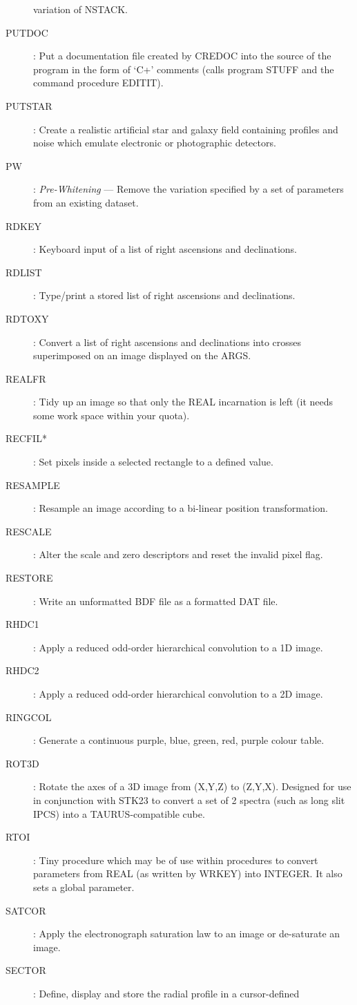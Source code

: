 \begin{description}
variation of NSTACK.
\item [PUTDOC]: Put a documentation file created by CREDOC into the source of
the program in the form of `C+' comments (calls program STUFF and the command
procedure EDITIT).
\item [PUTSTAR]: Create a realistic artificial star and galaxy field containing
profiles and noise which emulate electronic or photographic detectors.
\item [PW]: {\em Pre-Whitening} --- Remove the variation specified by a set of
parameters from an existing dataset.
\item [RDKEY]: Keyboard input of a list of right ascensions and declinations.
\item [RDLIST]: Type/print a stored list of right ascensions and declinations.
\item [RDTOXY]: Convert a list of right ascensions and declinations into crosses
superimposed on an image displayed on the ARGS.
\item [REALFR]: Tidy up an image so that only the REAL incarnation is left (it
needs some work space within your quota).
\item [RECFIL*]: Set pixels inside a selected rectangle to a defined value.
\item [RESAMPLE]: Resample an image according to a bi-linear position
transformation.
\item [RESCALE]: Alter the scale and zero descriptors and reset the invalid
pixel flag.
\item [RESTORE]: Write an unformatted BDF file as a formatted DAT file.
\item [RHDC1]: Apply a reduced odd-order hierarchical convolution to a 1D
image.
\item [RHDC2]: Apply a reduced odd-order hierarchical convolution to a 2D
image.
\item [RINGCOL]: Generate a continuous purple, blue, green, red, purple colour
table.
\item [ROT3D]: Rotate the axes of a 3D image from (X,Y,Z) to (Z,Y,X).
Designed for use in conjunction with STK23 to convert a set of 2 spectra (such
as long slit IPCS) into a TAURUS-compatible cube.
\item [RTOI]: Tiny procedure which may be of use within procedures to
convert parameters from REAL (as written by WRKEY) into INTEGER.
It also sets a global parameter.
\item [SATCOR]: Apply the electronograph saturation law to an image or
de-saturate an image.
\item [SECTOR]: Define, display and store the radial profile in a cursor-defined

\end{description}

